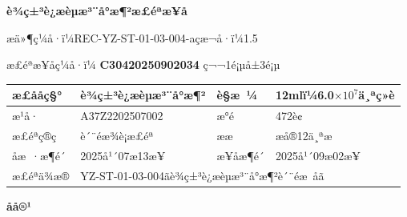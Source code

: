 \documentclass[UTF8,10pt,a4paper,fontset=fandol]{ctexart}
\newcommand{\fieldvalue}[1]{#1}
\begin{document}
\begin{center}
{\large \textbf{è¾ç±³è¿æèµæ³¨å°æ¶²æ£éªæ¥å}}
\end{center}

\noindent
æä»¶ç¼å·ï¼REC-YZ-ST-01-03-004-a\hfill çæ¬å·ï¼1.5

\medskip

\noindent
æ£éªæ¥åç¼å·ï¼
\fieldvalue{\textbf{C30420250902034}}
\qquad ç¬¬1é¡µå±3é¡µ

\small
\begin{tabularx}{\textwidth}{|>{\centering\arraybackslash}p{3.0cm}|X|>{\centering\arraybackslash}p{2.2cm}|X|}
\hline
æ£ååç§° &
\fieldvalue{è¾ç±³è¿æèµæ³¨å°æ¶²}
&
è§æ ¼ &
\fieldvalue{12mlï¼6.0$\times 10^{7}$ä¸ªç»è}
\\
\hline
æ¹å· &
\fieldvalue{A37Z2202507002}
&
æ°é &
\fieldvalue{472è¢}
\\
\hline
æ£éªç®ç &
\fieldvalue{è´¨éæ¾è¡æ£éª}
&
ææ &
\fieldvalue{æå®12ä¸ªæ}
\\
\hline
åæ ·æ¶é´ &
\fieldvalue{2025å¹´07æ13æ¥}
&
æ¥åæ¶é´ &
\fieldvalue{2025å¹´09æ02æ¥}
\\
\hline
æ£éªä¾æ® &
\multicolumn{3}{l|}{
\fieldvalue{YZ-ST-01-03-004ãè¾ç±³è¿æèµæ³¨å°æ¶²è´¨éæ åã}
}
\\
\hline
\end{tabularx}

\begin{center}
\textbf{åå®¹}
\end{center}
\end{document}
